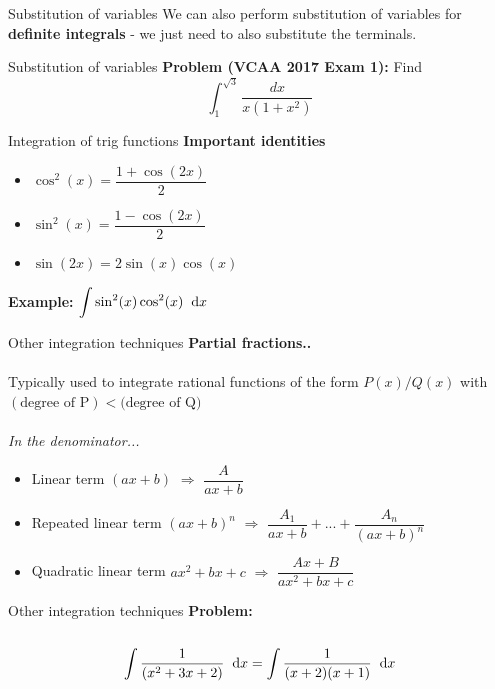\documentclass{beamer}
\renewcommand{\d}{\hspace{0.2cm}\text{d}}
\begin{document}
\begin{frame}{Substitution of variables}
	We can also perform substitution of variables for \textbf{definite integrals} - we just need to also substitute the terminals.
\end{frame}

\begin{frame}{Substitution of variables}
	\textbf{Problem (VCAA 2017 Exam 1):} Find $$\int_1^{\sqrt{3}} \dfrac{dx}{x(1+x^2)}$$
	\vspace{5cm}
\end{frame}

\begin{frame}{Integration of trig functions}
\textbf{Important identities}
\begin{itemize}
	\item $\cos^2(x) = \dfrac{1 + \cos(2x)}{2}$
	\item $\sin^2(x) = \dfrac{1 - \cos(2x)}{2}$
	\item $\sin(2x) = 2\sin(x)\cos(x)$
\end{itemize}

\textbf{Example: } $\displaystyle\int \sin^2(x)\cos^2(x) \d x$

\end{frame}

\begin{frame}{Other integration techniques}
    \textbf{Partial fractions..}\\~\\
    Typically used to integrate rational functions of the form $P(x)/Q(x)$ with $(\text{degree of P}) < (\text{degree of Q)}$\\~\\
    \textit{In the denominator...}
    \begin{itemize}
        \item Linear term $(ax+b)$ $\Rightarrow$ $\dfrac{A}{ax+b}$
        \item Repeated linear term $(ax+b)^n$ $\Rightarrow$ $\dfrac{A_1}{ax+b} + ... + \dfrac{A_n}{(ax+b)^n}$
        \item Quadratic linear term $ax^2+bx+c$ $\Rightarrow$ $\dfrac{Ax+B}{ax^2 + bx + c}$
    \end{itemize}
\end{frame}

\begin{frame}{Other integration techniques}
    \textbf{Problem: }\\~\\
    $$\int \dfrac{1}{(x^2 + 3x + 2)} \d x = \int \dfrac{1}{(x+2)(x+1)} \d x$$
    \vspace{5cm}
\end{frame}
\end{document}
